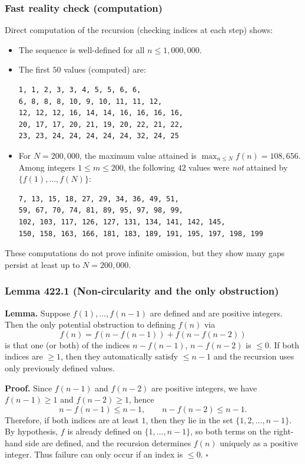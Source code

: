 \subsubsection*{Fast reality check (computation)}
Direct computation of the recursion (checking indices at each step) shows:
\begin{itemize}
\item The sequence is well-defined for all $n\le 1{,}000{,}000$.
\item The first $50$ values (computed) are:
\begin{verbatim}
1, 1, 2, 3, 3, 4, 5, 5, 6, 6,
6, 8, 8, 8, 10, 9, 10, 11, 11, 12,
12, 12, 12, 16, 14, 14, 16, 16, 16, 16,
20, 17, 17, 20, 21, 19, 20, 22, 21, 22,
23, 23, 24, 24, 24, 24, 24, 32, 24, 25
\end{verbatim}
\item For $N=200{,}000$, the maximum value attained is $\max_{n\le N} f(n)=108{,}656$.
Among integers $1\le m\le 200$, the following $42$ values were \emph{not} attained by $\{f(1),\dots,f(N)\}$:
\begin{verbatim}
7, 13, 15, 18, 27, 29, 34, 36, 49, 51,
59, 67, 70, 74, 81, 89, 95, 97, 98, 99,
102, 103, 117, 126, 127, 131, 134, 141, 142, 145,
150, 158, 163, 166, 181, 183, 189, 191, 195, 197, 198, 199
\end{verbatim}
\end{itemize}
These computations do not prove infinite omission, but they show many gaps persist at least up to $N=200{,}000$.

\subsubsection*{Lemma 422.1 (Non-circularity and the only obstruction)}
\textbf{Lemma.} Suppose $f(1),\dots,f(n-1)$ are defined and are positive integers. Then the only potential obstruction to defining $f(n)$ via
\[
 f(n)=f(n-f(n-1))+f(n-f(n-2))
\]
is that one (or both) of the indices $n-f(n-1)$, $n-f(n-2)$ is $\le 0$. If both indices are $\ge 1$, then they automatically satisfy $\le n-1$ and the recursion uses only previously defined values.

\textbf{Proof.}
Since $f(n-1)$ and $f(n-2)$ are positive integers, we have $f(n-1)\ge 1$ and $f(n-2)\ge 1$, hence
\[
n-f(n-1)\le n-1,\qquad n-f(n-2)\le n-1.
\]
Therefore, if both indices are at least $1$, then they lie in the set $\{1,2,\dots,n-1\}$.
By hypothesis, $f$ is already defined on $\{1,\dots,n-1\}$, so both terms on the right-hand side are defined, and the recursion determines $f(n)$ uniquely as a positive integer.
Thus failure can only occur if an index is $\le 0$.
\hfill$\square$

